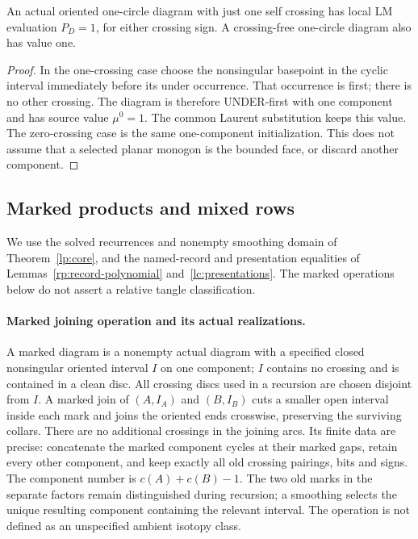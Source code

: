 \begin{lemma}
\label{lc:single-crossing}
An actual oriented one-circle diagram with just one self crossing has
local LM evaluation $P_D=1$, for either crossing sign. A crossing-free
one-circle diagram also has value one.
\end{lemma}
\begin{proof}
In the one-crossing case choose the nonsingular basepoint in the cyclic
interval immediately before its under occurrence. That occurrence is
first; there is no other crossing. The diagram is therefore UNDER-first
with one component and has source value $\mu^0=1$. The common Laurent
substitution keeps this value. The zero-crossing case is the same
one-component initialization. This does not assume that a selected
planar monogon is the bounded face, or discard another component.
\end{proof}


\subsection{Marked products and mixed rows}

We use the solved recurrences and nonempty smoothing domain of
Theorem~\ref{lp:core}, and the named-record and presentation equalities
of Lemmas~\ref{rp:record-polynomial} and~\ref{lc:presentations}.
The marked operations below do not assert a relative tangle classification.

\paragraph{Marked joining operation and its actual realizations.}
A marked diagram is a nonempty actual diagram with a specified closed
nonsingular oriented interval $I$ on one component; $I$ contains no
crossing and is contained in a clean disc. All crossing discs used in a
recursion are chosen disjoint from $I$. A marked join of $(A,I_A)$ and
$(B,I_B)$ cuts a smaller open interval inside each mark and joins the
oriented ends crosswise, preserving the surviving collars. There are no
additional crossings in the joining arcs. Its finite data are precise:
concatenate the marked component cycles at their marked gaps, retain
every other component, and keep exactly all old crossing pairings, bits
and signs. The component number is $c(A)+c(B)-1$. The two old marks in
the separate factors remain distinguished during recursion; a smoothing
selects the unique resulting component containing the relevant interval.
The operation is not defined as an unspecified ambient isotopy class.

